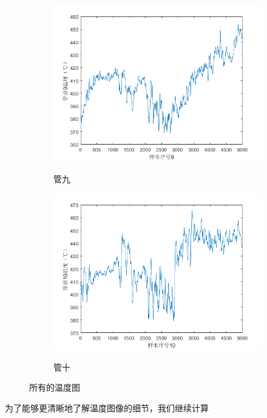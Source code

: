 \begin{figure}
            \begin{subfigure}{0.40\textwidth}
                \includegraphics[width=\textwidth]{figures/p1_9.png}
                \label{p1_9}
                \caption{管九}
            \end{subfigure}
            \begin{subfigure}{0.40\textwidth}
                \includegraphics[width=\textwidth]{figures/p1_10.png}
                \label{p1_10}
                \caption{管十}
            \end{subfigure}
            \caption{所有的温度图}
            \label{all_temper}
        \end{figure}
        为了能够更清晰地了解温度图像的细节，我们继续计算
